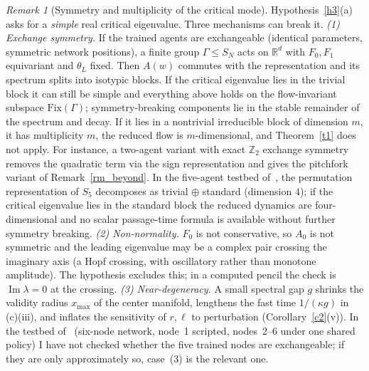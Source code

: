 \documentclass[11pt]{article}
\theoremstyle{definition}
\theoremstyle{remark}
\newtheorem{remark}{Remark}
\newcommand{\R}{\mathbb{R}}
\begin{document}
\begin{remark}[Symmetry and multiplicity of the critical mode]\label{rm_sym}
Hypothesis~\ref{h3}(a) asks for a \emph{simple} real critical eigenvalue. Three mechanisms can break it.
\emph{(1) Exchange symmetry.} If the trained agents are exchangeable (identical parameters, symmetric network positions), a finite group $\Gamma\le S_N$ acts on $\R^d$ with $F_0,F_1$ equivariant and $\theta_L$ fixed. Then $A(w)$ commutes with the representation and its spectrum splits into isotypic blocks. If the critical eigenvalue lies in the trivial block it can still be simple and everything above holds on the flow-invariant subspace $\mathrm{Fix}(\Gamma)$; symmetry-breaking components lie in the stable remainder of the spectrum and decay. If it lies in a nontrivial irreducible block of dimension $m$, it has multiplicity $m$, the reduced flow is $m$-dimensional, and Theorem~\ref{t1} does not apply. For instance, a two-agent variant with exact $\mathbb Z_2$ exchange symmetry removes the quadratic term via the sign representation and gives the pitchfork variant of Remark~\ref{rm_beyond}. In the five-agent testbed of~\cite{P}, the permutation representation of $S_5$ decomposes as trivial $\oplus$ standard (dimension $4$); if the critical eigenvalue lies in the standard block the reduced dynamics are four-dimensional and no scalar passage-time formula is available without further symmetry breaking.
\emph{(2) Non-normality.} $F_0$ is not conservative, so $A_0$ is not symmetric and the leading eigenvalue may be a complex pair crossing the imaginary axis (a Hopf crossing, with oscillatory rather than monotone amplitude). The hypothesis excludes this; in a computed pencil the check is $\operatorname{Im}\lambda=0$ at the crossing.
\emph{(3) Near-degeneracy.} A small spectral gap $g$ shrinks the validity radius $x_{\max}$ of the center manifold, lengthens the fast time $1/(\kappa g)$ in (c)(iii), and inflates the sensitivity of $r,\ell$ to perturbation (Corollary~\ref{c2}(v)). In the testbed of~\cite{P} (six-node network, node~1 scripted, nodes~2--6 under one shared policy) I have not checked whether the five trained nodes are exchangeable; if they are only approximately so, case~(3) is the relevant one.
\end{remark}
\end{document}

